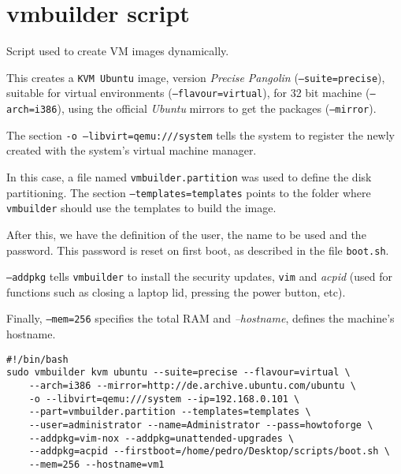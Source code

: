 \chapter{vmbuilder script} \label{chap:ap5}

Script used to create VM images dynamically.

This creates a \texttt{KVM Ubuntu} image, version \textit{Precise Pangolin} (\texttt{--suite=precise}), suitable for virtual environments (\texttt{--flavour=virtual}), for 32 bit machine (\texttt{--arch=i386}), using the official \textit{Ubuntu} mirrors to get the packages (\texttt{--mirror}).

The section \texttt{-o --libvirt=qemu:///system} tells the system to register the newly created with the system's virtual machine manager.

In this case, a file named \texttt{vmbuilder.partition} was used to define the disk partitioning. The section \texttt{--templates=templates} points to the folder where \texttt{vmbuilder} should use the templates to build the image. 

After this, we have the definition of the user, the name to be used and the password. This password is reset on first boot, as described in the file \texttt{boot.sh}.

\texttt{--addpkg} tells \texttt{vmbuilder} to install the security updates, \texttt{vim} and \textit{acpid} (used for functions such as closing a laptop lid, pressing the power button, etc).

Finally, \texttt{--mem=256} specifies the total RAM and \textit{--hostname}, defines the machine's hostname.
\begin{verbatim}
#!/bin/bash
sudo vmbuilder kvm ubuntu --suite=precise --flavour=virtual \
	--arch=i386 --mirror=http://de.archive.ubuntu.com/ubuntu \
	-o --libvirt=qemu:///system --ip=192.168.0.101 \
	--part=vmbuilder.partition --templates=templates \
	--user=administrator --name=Administrator --pass=howtoforge \
	--addpkg=vim-nox --addpkg=unattended-upgrades \
	--addpkg=acpid --firstboot=/home/pedro/Desktop/scripts/boot.sh \
	--mem=256 --hostname=vm1 
\end{verbatim}
